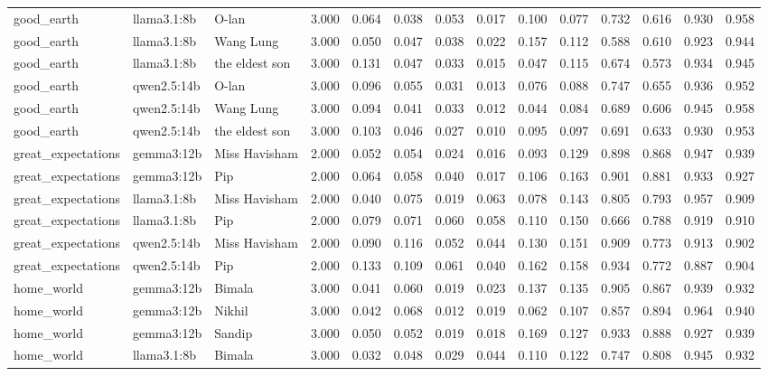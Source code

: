 \documentclass[10pt]{article}
\begin{document}
{\begin{longtable}{lllrrrrrrrrrrr}
good\_earth & llama3.1:8b & O-lan & 3.000 & 0.064 & 0.038 & 0.053 & 0.017 & 0.100 & 0.077 & 0.732 & 0.616 & 0.930 & 0.958 \\
good\_earth & llama3.1:8b & Wang Lung & 3.000 & 0.050 & 0.047 & 0.038 & 0.022 & 0.157 & 0.112 & 0.588 & 0.610 & 0.923 & 0.944 \\
good\_earth & llama3.1:8b & the eldest son & 3.000 & 0.131 & 0.047 & 0.033 & 0.015 & 0.047 & 0.115 & 0.674 & 0.573 & 0.934 & 0.945 \\
good\_earth & qwen2.5:14b & O-lan & 3.000 & 0.096 & 0.055 & 0.031 & 0.013 & 0.076 & 0.088 & 0.747 & 0.655 & 0.936 & 0.952 \\
good\_earth & qwen2.5:14b & Wang Lung & 3.000 & 0.094 & 0.041 & 0.033 & 0.012 & 0.044 & 0.084 & 0.689 & 0.606 & 0.945 & 0.958 \\
good\_earth & qwen2.5:14b & the eldest son & 3.000 & 0.103 & 0.046 & 0.027 & 0.010 & 0.095 & 0.097 & 0.691 & 0.633 & 0.930 & 0.953 \\
great\_expectations & gemma3:12b & Miss Havisham & 2.000 & 0.052 & 0.054 & 0.024 & 0.016 & 0.093 & 0.129 & 0.898 & 0.868 & 0.947 & 0.939 \\
great\_expectations & gemma3:12b & Pip & 2.000 & 0.064 & 0.058 & 0.040 & 0.017 & 0.106 & 0.163 & 0.901 & 0.881 & 0.933 & 0.927 \\
great\_expectations & llama3.1:8b & Miss Havisham & 2.000 & 0.040 & 0.075 & 0.019 & 0.063 & 0.078 & 0.143 & 0.805 & 0.793 & 0.957 & 0.909 \\
great\_expectations & llama3.1:8b & Pip & 2.000 & 0.079 & 0.071 & 0.060 & 0.058 & 0.110 & 0.150 & 0.666 & 0.788 & 0.919 & 0.910 \\
great\_expectations & qwen2.5:14b & Miss Havisham & 2.000 & 0.090 & 0.116 & 0.052 & 0.044 & 0.130 & 0.151 & 0.909 & 0.773 & 0.913 & 0.902 \\
great\_expectations & qwen2.5:14b & Pip & 2.000 & 0.133 & 0.109 & 0.061 & 0.040 & 0.162 & 0.158 & 0.934 & 0.772 & 0.887 & 0.904 \\
home\_world & gemma3:12b & Bimala & 3.000 & 0.041 & 0.060 & 0.019 & 0.023 & 0.137 & 0.135 & 0.905 & 0.867 & 0.939 & 0.932 \\
home\_world & gemma3:12b & Nikhil & 3.000 & 0.042 & 0.068 & 0.012 & 0.019 & 0.062 & 0.107 & 0.857 & 0.894 & 0.964 & 0.940 \\
home\_world & gemma3:12b & Sandip & 3.000 & 0.050 & 0.052 & 0.019 & 0.018 & 0.169 & 0.127 & 0.933 & 0.888 & 0.927 & 0.939 \\
home\_world & llama3.1:8b & Bimala & 3.000 & 0.032 & 0.048 & 0.029 & 0.044 & 0.110 & 0.122 & 0.747 & 0.808 & 0.945 & 0.932 \\

\end{longtable}}
\end{document}
